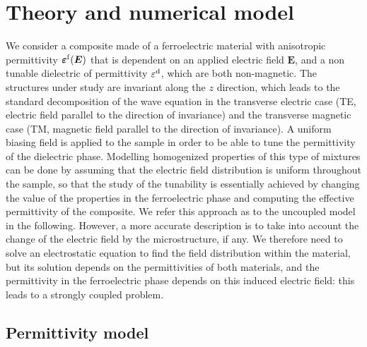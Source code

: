 \documentclass[%
 reprint,
 amsmath,amssymb,
 aps,
]{revtex4-2}
\newcommand{\B}{\boldsymbol}
\newcommand{\tens}[1]{\B{#1}}
\newcommand{\epsftens}{\tens{\varepsilon}^{\rm f}}
\newcommand{\epsd}{\varepsilon^{\rm d}}
\begin{document}

\section*{Theory and numerical model}

We consider a composite made of a ferroelectric material with anisotropic
permittivity $\epsftens(\B E)$
that is dependent on an applied electric field $\B E$,
and a non tunable dielectric of permittivity $\epsd$, which are both non-magnetic.
The structures under study are invariant along the $z$ direction, which leads to the standard decomposition
of the wave equation in the transverse electric case (TE, electric field parallel
 to the direction of invariance) and the
transverse magnetic case (TM, magnetic field parallel to the direction
of invariance).
A uniform biasing field is applied to the sample in order to be able to tune the
permittivity of the dielectric phase.
Modelling homogenized properties of this type of mixtures can be done by assuming
that the electric field distribution is uniform throughout the sample,
so that the study of the tunability is
essentially achieved by changing the value of the properties in the ferroelectric phase and computing
 the effective permittivity
of the composite. We refer this approach as to the uncoupled model in the following.
However, a more accurate description is to take into account the change of the
electric field by the microstructure, if any. We therefore need to solve an
electrostatic equation to find the field distribution within the material, but its solution
depends on the permittivities of both materials, and the permittivity in the
ferroelectric phase depends on this induced electric field: this leads to a strongly coupled problem.\\

\subsection*{Permittivity model\label{permmodel}}
\end{document}
